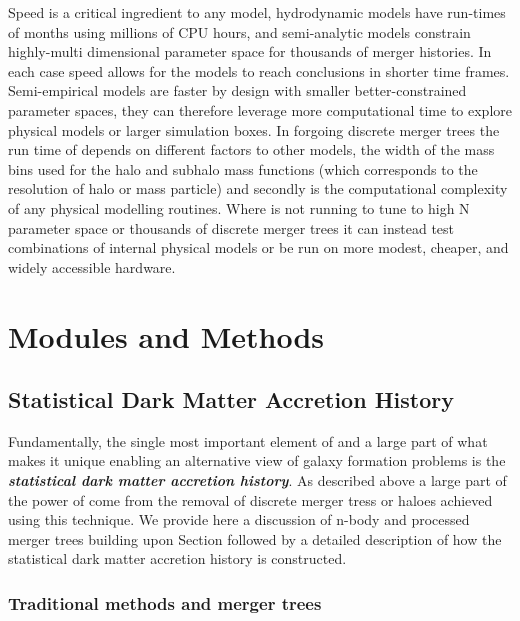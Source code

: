 Speed is a critical ingredient to any model, hydrodynamic models have run-times of months using millions of CPU hours, and semi-analytic models constrain highly-multi dimensional parameter space for thousands of merger histories. In each case speed allows for the models to reach conclusions in shorter time frames. Semi-empirical models are faster by design with smaller better-constrained parameter spaces, they can therefore leverage more computational time to explore physical models or larger simulation boxes. In forgoing discrete merger trees the run time of \steel depends on different factors to other models, the width of the mass bins used for the halo and subhalo mass functions (which corresponds to the resolution of halo or mass particle) and secondly is the computational complexity of any physical modelling routines. Where \steel is not running to tune to high N parameter space or thousands of discrete merger trees it can instead test combinations of internal physical models or be run on more modest, cheaper, and widely accessible hardware.

\section{Modules and Methods}

\subsection{Statistical Dark Matter Accretion History}
\label{subsec:SDMAH}

Fundamentally, the single most important element of \steel and a large part of what makes it unique enabling an alternative view of galaxy formation problems is the \textbf{\textit{statistical dark matter accretion history}}. As described above a large part of the power of \steel come from the removal of discrete merger tress or haloes achieved using this technique. We provide here a discussion of n-body and processed merger trees building upon Section \label{sec:LCDM} followed by a detailed description of how the statistical dark matter accretion history is constructed.

\subsubsection{Traditional methods and merger trees}


